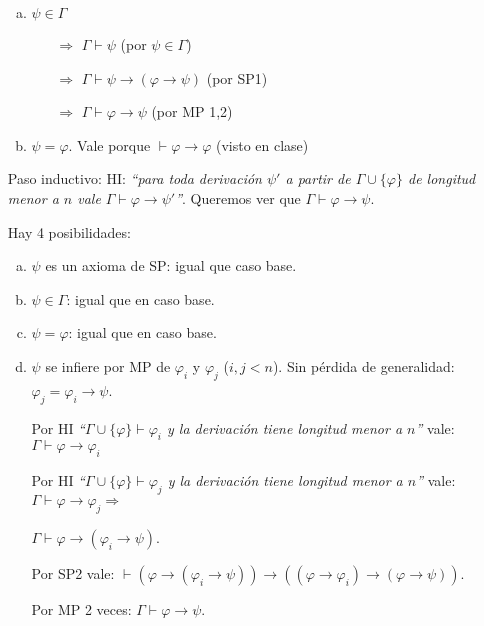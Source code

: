 \begin{questions}
\begin{solution}
\begin{itemize}[\quad]
\begin{enumerate}[a)]
   \item $\psi\in\Gamma$
   \begin{enumerate}
      \item[$\Rightarrow$] $\Gamma\vdash\psi$ \hfill (por $\psi\in\Gamma$)
      \item[$\Rightarrow$] $\Gamma\vdash\psi\rightarrow(\varphi\rightarrow\psi)$ \hfill (por SP1)
      \item[$\Rightarrow$] $\Gamma\vdash\varphi\rightarrow\psi$ \hfill (por MP 1,2)
    \end{enumerate}
    
   \item $\psi=\varphi$. 
    Vale porque $\vdash\varphi\rightarrow\varphi$ (visto en clase)
  \end{enumerate}

  \item[Paso inductivo:] HI: {\it ``para toda derivaci\'on $\psi'$ a partir de $\Gamma\cup\{\varphi\}$ de longitud menor a $n$ vale $\Gamma\vdash\varphi\rightarrow\psi'$''}. Queremos ver que $\Gamma\vdash\varphi\rightarrow\psi$. 
  
  Hay 4 posibilidades: 
  \begin{enumerate}[a)]
   \item $\psi$ es un axioma de SP: igual que caso base. 
   \item $\psi\in\Gamma$: igual que en caso base. 
   \item $\psi=\varphi$: igual que en caso base. 
   \item $\psi$ se infiere por MP de $\varphi_i$ y $\varphi_j$ ($i,j<n$). Sin p\'erdida de generalidad: $\varphi_j=\varphi_i\rightarrow\psi$. 
   
    Por HI {\it ``$\Gamma\cup\{\varphi\}\vdash\varphi_i$ y la derivaci\'on tiene longitud menor a $n$''} vale: $\Gamma\vdash\varphi\rightarrow\varphi_i$
    
    Por HI {\it ``$\Gamma\cup\{\varphi\}\vdash\varphi_j$ y la derivaci\'on tiene longitud menor a $n$''} vale: $\Gamma\vdash\varphi\rightarrow\varphi_j\Rightarrow$
    
    \hfill $\Gamma\vdash\varphi\rightarrow(\varphi_i\rightarrow\psi)$.
    
    Por SP2 vale: $\vdash (\varphi\rightarrow(\varphi_i\rightarrow\psi))\rightarrow((\varphi\rightarrow\varphi_i)\rightarrow(\varphi\rightarrow\psi))$.
    
    Por MP 2 veces: $\Gamma\vdash\varphi\rightarrow\psi$.
  \end{enumerate}


\end{itemize}
\end{solution}
\end{questions}
